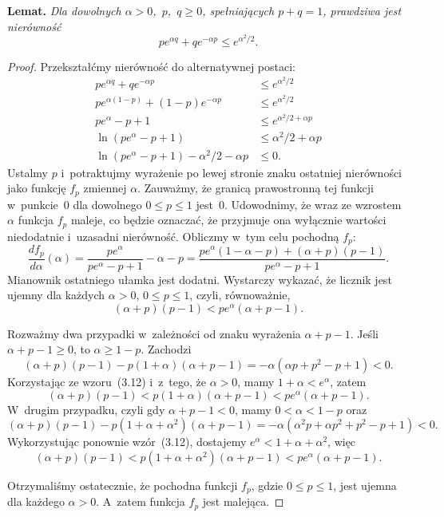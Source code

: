 \exercise %

\noindent\textsf{\textbf{Lemat.}} \textit{Dla dowolnych $\alpha>0$,~\/$p$,~\/$q\ge0$, spełniających\/ $p+q=1$, prawdziwa jest nierówność}
	\[
		pe^{\alpha q}+qe^{-\alpha p} \le e^{\alpha^2\!/2}.
	\]
\begin{proof}
	Przekształćmy nierówność do alternatywnej postaci:
	\begin{align*}
		pe^{\alpha q}+qe^{-\alpha p} &\le e^{\alpha^2\!/2} \\
		pe^{\alpha(1-p)}+(1-p)e^{-\alpha p} &\le e^{\alpha^2\!/2} \\
		pe^\alpha-p+1 &\le e^{\alpha^2\!/2+\alpha p} \\
		\ln(pe^\alpha-p+1) &\le \alpha^2\!/2+\alpha p \\
		\ln(pe^\alpha-p+1)-\alpha^2\!/2-\alpha p &\le 0.
	\end{align*}
	Ustalmy $p$ i~potraktujmy wyrażenie po lewej stronie znaku ostatniej nierówności jako funkcję $f_p$ zmiennej $\alpha$. Zauważmy, że granicą prawostronną tej funkcji w~punkcie~0 dla dowolnego $0\le p\le1$ jest~0. Udowodnimy, że wraz ze wzrostem $\alpha$ funkcja $f_p$ maleje, co będzie oznaczać, że przyjmuje ona wyłącznie wartości niedodatnie i~uzasadni nierówność. Obliczmy w~tym celu pochodną $f_p$:
	\[
	    \frac{df_p}{d\alpha}(\alpha) = \frac{pe^\alpha}{pe^\alpha-p+1}-\alpha-p = \frac{pe^\alpha(1-\alpha-p)+(\alpha+p)(p-1)}{pe^\alpha-p+1}.
	\]
	Mianownik ostatniego ułamka jest dodatni. Wystarczy wykazać, że licznik jest ujemny dla każdych $\alpha>0$, $0\le p\le1$, czyli, równoważnie,
	\[
	    (\alpha+p)(p-1) < pe^\alpha(\alpha+p-1).
	\]

	Rozważmy dwa przypadki w~zależności od znaku wyrażenia $\alpha+p-1$. Jeśli $\alpha+p-1\ge0$, to $\alpha\ge1-p$. Zachodzi
	\[
	    (\alpha+p)(p-1)-p(1+\alpha)(\alpha+p-1) = -\alpha(\alpha p+p^2-p+1) < 0.
	\]
	Korzystając ze wzoru~(3.12) i~z~tego, że $\alpha>0$, mamy $1+\alpha<e^\alpha$, zatem
	\[
	    (\alpha+p)(p-1) < p(1+\alpha)(\alpha+p-1) < pe^\alpha(\alpha+p-1).
	\]
	W~drugim przypadku, czyli gdy $\alpha+p-1<0$, mamy $0<\alpha<1-p$ oraz
	\[
	    (\alpha+p)(p-1)-p(1+\alpha+\alpha^2)(\alpha+p-1) = -\alpha(\alpha^2p+\alpha p^2+p^2-p+1) < 0.
	\]
	Wykorzystując ponownie wzór~(3.12), dostajemy $e^\alpha<1+\alpha+\alpha^2$, więc
	\[
		(\alpha+p)(p-1) < p(1+\alpha+\alpha^2)(\alpha+p-1) < pe^\alpha(\alpha+p-1).
	\]

	Otrzymaliśmy ostatecznie, że pochodna funkcji $f_p$, gdzie $0\le p\le1$, jest ujemna dla każdego $\alpha>0$. A~zatem funkcja $f_p$ jest malejąca.
\end{proof}

